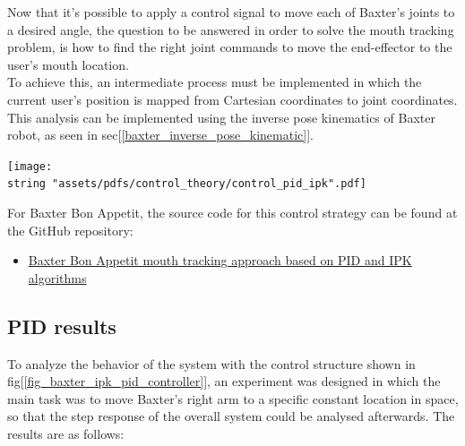 \documentclass[11pt]{report} %
\begin{document}
Now that it's possible to apply a control signal to move each of Baxter's joints to a desired angle, the question to be answered in order to solve the mouth tracking problem, is how to find the right joint commands to move the end-effector to the user's mouth location.\\

To achieve this, an intermediate process must be implemented in which the current user's position is mapped from Cartesian coordinates to joint coordinates. This analysis can be implemented using the inverse pose kinematics of Baxter robot, as seen in sec[\ref{baxter_inverse_pose_kinematic}]. \\

\begin{center}
\texttt{[image: \\string "assets/pdfs/control\_theory/control\_pid\_ipk".pdf]}
\bigbreak
\begin{minipage}{\linewidth} %
\label{fig_baxter_ipk_pid_controller}
\end{minipage} \end{center}

For Baxter Bon Appetit, the source code for this control strategy can be found at the GitHub repository:

\begin{itemize}
    \color{blue}
    \item \href{https://github.com/san99tiago/baxter-bon-appetit/blob/main/python/baxter_bon_appetit/scripts/node_open_loop_control_trajectory.py}{Baxter Bon Appetit mouth tracking approach based on PID and IPK algorithms}
\end{itemize}

\subsection{PID results}
To analyze the behavior of the system with the control structure shown in fig[\ref{fig_baxter_ipk_pid_controller}], an experiment was designed in which the main task was to move Baxter's right arm to a specific constant location in space, so that the step response of the overall system could be analysed afterwards. The results are as follows:
\end{document}
